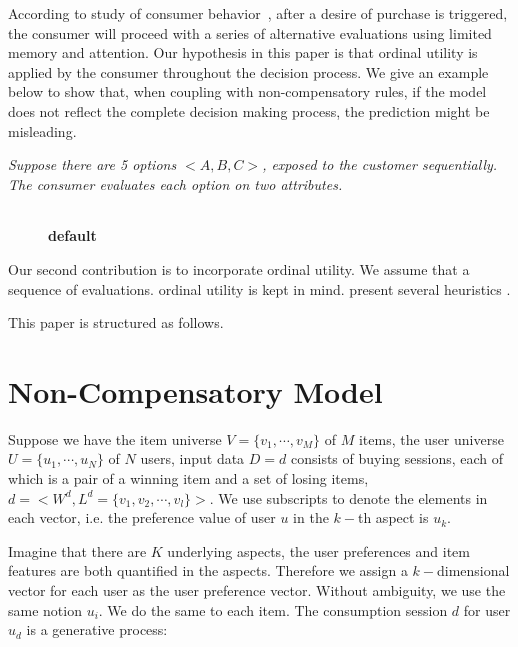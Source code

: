 \documentclass[sigconf]{acmart}
\begin{document}
According to study of consumer behavior~\cite{Engel1986Consumer}, after a desire of purchase is triggered, the consumer will proceed with a series of alternative evaluations using limited memory and attention.  Our hypothesis in this paper is that ordinal utility is applied by the consumer throughout the decision process. We give an example below to show that, when coupling with non-compensatory rules, if the model does not reflect the complete decision making process, the prediction might be misleading.


\emph{Suppose there are 5 options $<A,B,C>$, exposed to the customer sequentially. The consumer evaluates each option on two attributes. }

\begin{figure}[htbp]
\begin{center}
\begin{tabular}{|c|c|}

\end{tabular}
\caption{{\bf default}}
\label{default}
\end{center}
\end{figure}


%



Our second contribution is to incorporate ordinal utility. We assume that a sequence of evaluations. ordinal utility is kept in mind. present several heuristics .

  
  This paper is structured as follows. 
 



\section{Non-Compensatory Model}\label{sec:model1}

Suppose we have the item universe $V=\{v_1,\cdots,v_M\}$ of $M$ items, the user universe $U=\{u_1,\cdots,u_N\}$ of $N$ users, input data $D={d}$ consists of buying sessions, each of which is a pair of a winning item and a set of losing items, $d=<W^d,L^d=\{v_1,v_2,\cdots,v_l\}>$. We use subscripts to denote the elements in each vector, i.e. the preference value of user $u$ in the $k-$th aspect is $u_k$. 

Imagine that there are $K$ underlying aspects, the user preferences and item features are both quantified in the aspects. Therefore we assign a $k-$dimensional vector for each user as the user preference vector. Without ambiguity, we use the same notion $u_i$. We do the same to each item. The consumption session $d$ for user $u_d$ is a generative process:
\end{document}
